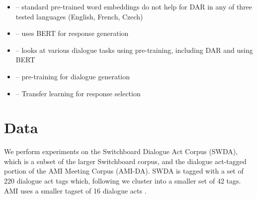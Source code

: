 \documentclass[11pt,a4paper]{article}
\begin{document}
\begin{itemize}
  \item \citet{cerisaraEffectsUsingWord2vec2017} -- standard pre-trained word embeddings do not help for DAR in any of three tested languages (English, French, Czech)
  \item \citet{chenSemanticallyConditionedDialog2019a} -- uses BERT for response generation
  \item \citet{mehriPretrainingMethodsDialog2019} -- looks at various dialogue tasks using pre-training, including DAR and using BERT
  \item \citet{baoPLATOPretrainedDialogue2019} -- pre-training for dialogue generation
  \item \citet{vigComparisonTransferLearningApproaches} -- Transfer learning for response selection
\end{itemize}

\section{Data}
We perform experiments on the Switchboard Dialogue Act Corpus (SWDA), which is a subset of the larger Switchboard corpus, and the dialogue act-tagged portion of the AMI Meeting Corpus (AMI-DA). 
SWDA is tagged with a set of 220 dialogue act tags which, following  \citet{jurafskySwitchboardSWBDDAMSLShallowDiscourseFunction1997a} we cluster into a smaller set of 42 tags.
AMI uses a smaller tagset of 16 dialogue acts \citep{GuidelinesDialogueAct2005}.

\end{document}
